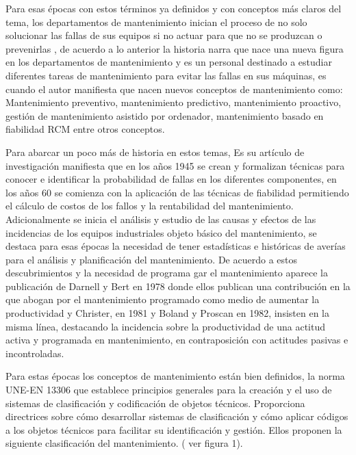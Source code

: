 \documentclass[
  11pt,
  bookmarksnumbered]{article}
\begin{document}
Para esas épocas con estos términos ya definidos y con conceptos más claros del tema, los departamentos de mantenimiento inician el proceso de no solo solucionar las fallas de sus equipos si no actuar para que no se produzcan o prevenirlas \textcite{Garcia2010}, de acuerdo a lo anterior la historia narra que nace una nueva figura en los departamentos de mantenimiento y es un personal destinado a estudiar diferentes tareas de mantenimiento para evitar las fallas en sus máquinas, es cuando el autor manifiesta que nacen nuevos conceptos de mantenimiento como: Mantenimiento preventivo, mantenimiento predictivo, mantenimiento proactivo, gestión de mantenimiento asistido por ordenador, mantenimiento basado en fiabilidad RCM entre otros conceptos.

Para abarcar un poco más de historia en estos temas, \textcite{Carcel-Carrasco2016} Es su artículo de investigación manifiesta que en los años 1945 se crean y formalizan técnicas para conocer e identificar la probabilidad de fallas en los diferentes componentes, en los años 60 se comienza con la aplicación de las técnicas de fiabilidad permitiendo el cálculo de costos de los fallos y la rentabilidad del mantenimiento.
Adicionalmente se inicia el análisis y estudio de las causas y efectos de las incidencias de los equipos industriales objeto básico del mantenimiento, se destaca para esas épocas la necesidad de tener estadísticas e históricas de averías para el análisis y planificación del mantenimiento.
De acuerdo a estos descubrimientos y la necesidad de programa gar el mantenimiento aparece la publicación de Darnell y Bert en 1978 donde ellos publican una contribución en la que abogan por el mantenimiento programado como medio de aumentar la productividad y Christer, en 1981 y Boland y Proscan en 1982, insisten en la misma línea, destacando la incidencia sobre la productividad de una actitud activa y programada en mantenimiento, en contraposición con actitudes pasivas e incontroladas.

Para estas épocas los conceptos de mantenimiento están bien definidos, la norma UNE-EN 13306 que establece principios generales para la creación y el uso de sistemas de clasificación y codificación de objetos técnicos.
Proporciona directrices sobre cómo desarrollar sistemas de clasificación y cómo aplicar códigos a los objetos técnicos para facilitar su identificación y gestión.
Ellos proponen la siguiente clasificación del mantenimiento.
( ver figura 1).
\end{document}
